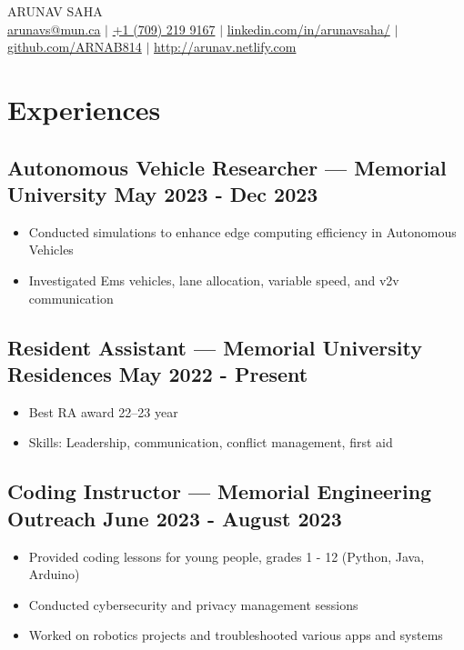 \documentclass[10pt]{article}
\begin{document}
\begin{center}
    {\fontsize{32}{32}\selectfont\interthin ARUNAV SAHA} \\ \bigskip
    {\color{icnclr}\faEnvelope[regular]} \href{mailto:arunavs@mun.ca}{arunavs@mun.ca} $|$ 
    {\color{icnclr}} \href{tel:+17092199167}{+1 (709) 219 9167} $|$
    {\color{icnclr}\faLinkedinIn} \href{https://www.linkedin.com/in/arunavsaha/}{linkedin.com/in/arunavsaha/} $|$
    {\color{icnclr}\faGithub} \href{https://github.com/ARNAB814}{github.com/ARNAB814} $|$
    {\color{icnclr}\faGlobe} \href{http://arunav.netlify.com}{http://arunav.netlify.com}
\end{center}

\section{Experiences}
\subsection{Autonomous Vehicle Researcher — Memorial University \hfill May 2023 - Dec 2023}
\begin{itemize}
    \item Conducted simulations to enhance edge computing efficiency in Autonomous Vehicles
    \item Investigated Ems vehicles, lane allocation, variable speed, and v2v communication
\end{itemize}

\subsection{Resident Assistant — Memorial University Residences \hfill May 2022 - Present}
\begin{itemize}
    \item Best RA award 22–23 year
    \item Skills: Leadership, communication, conflict management, first aid
\end{itemize}

\subsection{Coding Instructor — Memorial Engineering Outreach \hfill June 2023 - August 2023}
\begin{itemize}
    \item Provided coding lessons for young people, grades 1 - 12 (Python, Java, Arduino)
    \item Conducted cybersecurity and privacy management sessions
    \item Worked on robotics projects and troubleshooted various apps and systems
\end{itemize}
\end{document}
